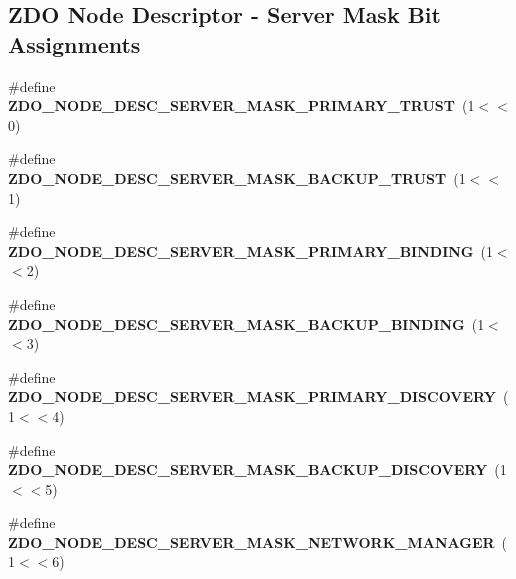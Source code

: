\subsection*{Z\-D\-O Node Descriptor -\/ Server Mask Bit Assignments}
\begin{DoxyCompactItemize}
\item 
\hypertarget{group__zdo_ga047221deea621025ac8dcaaf1f2338f2}{\#define {\bfseries Z\-D\-O\-\_\-\-N\-O\-D\-E\-\_\-\-D\-E\-S\-C\-\_\-\-S\-E\-R\-V\-E\-R\-\_\-\-M\-A\-S\-K\-\_\-\-P\-R\-I\-M\-A\-R\-Y\-\_\-\-T\-R\-U\-S\-T}~(1$<$$<$0)}\label{group__zdo_ga047221deea621025ac8dcaaf1f2338f2}

\item 
\hypertarget{group__zdo_gade4cff93e5bb2144c457b5cd2662901f}{\#define {\bfseries Z\-D\-O\-\_\-\-N\-O\-D\-E\-\_\-\-D\-E\-S\-C\-\_\-\-S\-E\-R\-V\-E\-R\-\_\-\-M\-A\-S\-K\-\_\-\-B\-A\-C\-K\-U\-P\-\_\-\-T\-R\-U\-S\-T}~(1$<$$<$1)}\label{group__zdo_gade4cff93e5bb2144c457b5cd2662901f}

\item 
\hypertarget{group__zdo_gab02988bb51ab342541de959b6817548b}{\#define {\bfseries Z\-D\-O\-\_\-\-N\-O\-D\-E\-\_\-\-D\-E\-S\-C\-\_\-\-S\-E\-R\-V\-E\-R\-\_\-\-M\-A\-S\-K\-\_\-\-P\-R\-I\-M\-A\-R\-Y\-\_\-\-B\-I\-N\-D\-I\-N\-G}~(1$<$$<$2)}\label{group__zdo_gab02988bb51ab342541de959b6817548b}

\item 
\hypertarget{group__zdo_ga8c4d4bd7c4408c9490f946812ba19fa4}{\#define {\bfseries Z\-D\-O\-\_\-\-N\-O\-D\-E\-\_\-\-D\-E\-S\-C\-\_\-\-S\-E\-R\-V\-E\-R\-\_\-\-M\-A\-S\-K\-\_\-\-B\-A\-C\-K\-U\-P\-\_\-\-B\-I\-N\-D\-I\-N\-G}~(1$<$$<$3)}\label{group__zdo_ga8c4d4bd7c4408c9490f946812ba19fa4}

\item 
\hypertarget{group__zdo_gad76fcdfacf026313325c23ac2160f698}{\#define {\bfseries Z\-D\-O\-\_\-\-N\-O\-D\-E\-\_\-\-D\-E\-S\-C\-\_\-\-S\-E\-R\-V\-E\-R\-\_\-\-M\-A\-S\-K\-\_\-\-P\-R\-I\-M\-A\-R\-Y\-\_\-\-D\-I\-S\-C\-O\-V\-E\-R\-Y}~(1$<$$<$4)}\label{group__zdo_gad76fcdfacf026313325c23ac2160f698}

\item 
\hypertarget{group__zdo_ga2369288296faf5931decd53d0822acc7}{\#define {\bfseries Z\-D\-O\-\_\-\-N\-O\-D\-E\-\_\-\-D\-E\-S\-C\-\_\-\-S\-E\-R\-V\-E\-R\-\_\-\-M\-A\-S\-K\-\_\-\-B\-A\-C\-K\-U\-P\-\_\-\-D\-I\-S\-C\-O\-V\-E\-R\-Y}~(1$<$$<$5)}\label{group__zdo_ga2369288296faf5931decd53d0822acc7}

\item 
\hypertarget{group__zdo_ga44008802d01c87ad30c906829a799737}{\#define {\bfseries Z\-D\-O\-\_\-\-N\-O\-D\-E\-\_\-\-D\-E\-S\-C\-\_\-\-S\-E\-R\-V\-E\-R\-\_\-\-M\-A\-S\-K\-\_\-\-N\-E\-T\-W\-O\-R\-K\-\_\-\-M\-A\-N\-A\-G\-E\-R}~(1$<$$<$6)}\label{group__zdo_ga44008802d01c87ad30c906829a799737}

\end{DoxyCompactItemize}
